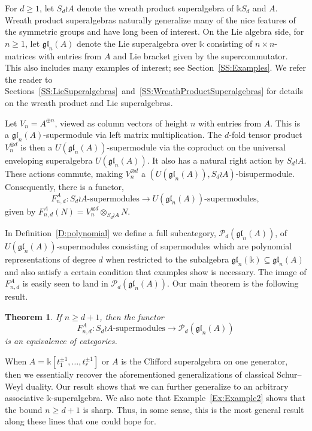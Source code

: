 \documentclass[11pt,reqno]{amsart} %
\newtheorem*{theorem*}{Theorem}
\newcommand{\gl}{\mathfrak{gl}}
\renewcommand{\k}{\mathds{k}}
\newcommand{\0}{\bar{0}}
\newcommand{\1}{\bar{1}}
\newcommand{\wreath}{\wr}
\newcommand{\SdwreathA}{S_{d} \wreath A}
\newcommand{\Pol}{\mathcal{P}}
\numberwithin{equation}{subsection}
\begin{document}
For $d \geq 1$, let $\SdwreathA$ denote the wreath product superalgebra of $\k S_{d}$ and $A$.  Wreath product superalgebras naturally generalize many of the nice features of the symmetric groups and have long been of interest.    On the Lie algebra side, for $n \geq 1$, let $\gl_{n}(A)$ denote the Lie superalgebra over $\k$ consisting of $n \times n$-matrices with entries from $A$ and Lie bracket given by the supercommutator.  This also includes many examples of interest; see Section~\ref{SS:Examples}.   We refer the reader to Sections~\ref{SS:LieSuperalgebras}~and~\ref{SS:WreathProductSuperalgebras} for details on the wreath product and Lie superalgebras.


Let $V_{n}= A^{\oplus n}$, viewed as column vectors of height $n$ with entries from $A$.  This is a $\gl_{n}(A)$-supermodule via left matrix multiplication.  The $d$-fold tensor product $V_{n}^{\otimes d}$ is then a $U(\gl_{n}(A))$-supermodule via the coproduct on the universal enveloping superalgebra $U(\gl_{n}(A))$.  It also has a natural right action by $\SdwreathA$.  These actions commute, making $V_{n}^{\otimes d}$ a $(U(\gl_{n}(A)), \SdwreathA )$-bisupermodule.  Consequently, there is a functor, 
\[
F^{A}_{n,d}: \SdwreathA \text{-supermodules} \to U(\gl_{n}(A))\text{-supermodules},
\] given by $F^{A}_{n,d}(N) = V_{n}^{\otimes d} \otimes_{\SdwreathA} N$.

In Definition~\ref{D:polynomial} we define a full subcategory, $\Pol_{d}(\gl_{n}(A))$, of $U(\gl_{n}(A))$-supermodules consisting of supermodules which are polynomial representations of degree $d$ when restricted to the subalgebra $\gl_{n}(\k) \subseteq \gl_{n}(A)$ and also satisfy a certain condition that examples show is necessary.  The image of $F^{A}_{n,d}$ is easily seen to land in $\Pol_{d}(\gl_{n}(A))$.  Our main theorem is the following result.

\begin{theorem*}\label{T:IntroMainTheorem} If $n \geq d+1$, then the functor 
\[
F^{A}_{n,d}: \SdwreathA \text{-supermodules} \to \Pol_{d}(\gl_{n}(A))
\] is an equivalence of categories.
\end{theorem*} 

When $A = \k [t_{1}^{\pm 1}, \dotsc , t_{r}^{\pm 1}]$ or $A$ is the Clifford superalgebra on one generator, then we essentially recover the aforementioned generalizations of classical Schur--Weyl duality.  Our result shows that we can further generalize to an arbitrary associative $\k$-superalgebra.  We also note that Example~\ref{Ex:Example2} shows that the bound $n \geq d+1$ is sharp.  Thus, in some sense, this is the most general result along these lines that one could hope for.
\end{document}
